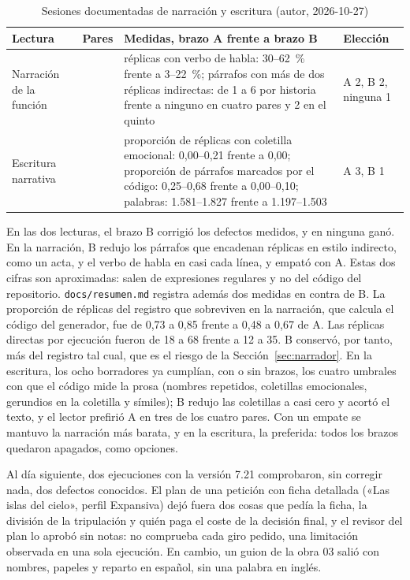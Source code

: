 \begin{table}[htb]
  \centering
  \caption{Sesiones documentadas de narración y escritura (autor, 2026-10-27)}
  \label{tab:lecturas}
  \small
  \begin{tabular}{@{}>{\raggedright\arraybackslash}p{2.2cm}>{\raggedright\arraybackslash}p{1.0cm}%
      >{\raggedright\arraybackslash}p{8.0cm}>{\raggedright\arraybackslash}p{2.2cm}@{}}
    \toprule
    Lectura & Pares & Medidas, brazo A frente a brazo B & Elección \\
    \midrule
    Narración de la función & 5 & réplicas con verbo de habla: 30--62~\% frente a 3--22~\%; párrafos
      con más de dos réplicas indirectas: de 1 a 6 por historia frente a ninguno en cuatro pares y 2
      en el quinto & A 2, B 2, ninguna 1 \\
    Escritura narrativa & 4 & proporción de réplicas con coletilla emocional: 0,00--0,21 frente a
      0,00; proporción de párrafos marcados por el código: 0,25--0,68 frente a 0,00--0,10; palabras:
      1.581--1.827 frente a 1.197--1.503 & A 3, B 1 \\
    \bottomrule
  \end{tabular}
\end{table}

En las dos lecturas, el brazo B corrigió los defectos medidos, y en ninguna ganó. En la narración, B
redujo los párrafos que encadenan réplicas en estilo indirecto, como un acta, y el verbo de habla en
casi cada línea, y empató con A. Estas dos cifras son aproximadas: salen de expresiones regulares y no
del código del repositorio. \texttt{docs/resumen.md} registra además dos medidas en contra de B. La
proporción de réplicas del registro que sobreviven en la narración, que calcula el código del
generador, fue de 0,73 a 0,85 frente a 0,48 a 0,67 de A. Las réplicas directas por ejecución fueron
de 18 a 68 frente a 12 a 35. B conservó, por tanto, más del registro tal cual, que es el riesgo de la
Sección~\ref{sec:narrador}. En la escritura, los ocho borradores ya
cumplían, con o sin brazos, los cuatro umbrales con que el código mide la prosa (nombres repetidos,
coletillas emocionales, gerundios en la coletilla y símiles); B redujo las coletillas a casi cero y
acortó el texto, y el lector prefirió A en tres de los cuatro pares. Con un empate se mantuvo la
narración más barata, y en la escritura, la preferida: todos los brazos quedaron apagados, como
opciones.

Al día siguiente, dos ejecuciones con la versión 7.21 comprobaron, sin corregir nada, dos defectos
conocidos. El plan de una petición con ficha detallada («Las islas del cielo», perfil Expansiva)
dejó fuera dos cosas que pedía la ficha, la división de la tripulación y quién paga el coste de la
decisión final, y el revisor del plan lo aprobó sin notas: no comprueba cada giro pedido, una
limitación observada en una sola ejecución. En cambio, un guion de la obra 03 salió con nombres,
papeles y reparto en español, sin una palabra en inglés.

